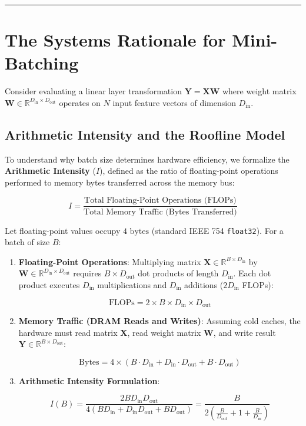 \documentclass[
  letterpaper,
]{scrbook}
\begin{document}
\begin{center}\rule{0.5\linewidth}{0.5pt}\end{center}

\section{The Systems Rationale for
Mini-Batching}\label{the-systems-rationale-for-mini-batching}

Consider evaluating a linear layer transformation
\(\mathbf{Y} = \mathbf{X} \mathbf{W}\) where weight matrix
\(\mathbf{W} \in \mathbb{R}^{D_{\text{in}} \times D_{\text{out}}}\)
operates on \(N\) input feature vectors of dimension \(D_{\text{in}}\).

\subsection{Arithmetic Intensity and the Roofline
Model}\label{arithmetic-intensity-and-the-roofline-model}

To understand why batch size determines hardware efficiency, we
formalize the \textbf{Arithmetic Intensity} (\(I\)), defined as the
ratio of floating-point operations performed to memory bytes transferred
across the memory bus:

\[I = \frac{\text{Total Floating-Point Operations (FLOPs)}}{\text{Total Memory Traffic (Bytes Transferred)}}\]

Let floating-point values occupy \(4\text{ bytes}\) (standard IEEE 754
\texttt{float32}). For a batch of size \(B\):

\begin{enumerate}
\def\labelenumi{\arabic{enumi}.}
\item
  \textbf{Floating-Point Operations}: Multiplying matrix
  \(\mathbf{X} \in \mathbb{R}^{B \times D_{\text{in}}}\) by
  \(\mathbf{W} \in \mathbb{R}^{D_{\text{in}} \times D_{\text{out}}}\)
  requires \(B \times D_{\text{out}}\) dot products of length
  \(D_{\text{in}}\). Each dot product executes \(D_{\text{in}}\)
  multiplications and \(D_{\text{in}}\) additions (\(2 D_{\text{in}}\)
  FLOPs):

  \[\text{FLOPs} = 2 \times B \times D_{\text{in}} \times D_{\text{out}}\]
\item
  \textbf{Memory Traffic (DRAM Reads and Writes)}: Assuming cold caches,
  the hardware must read matrix \(\mathbf{X}\), read weight matrix
  \(\mathbf{W}\), and write result
  \(\mathbf{Y} \in \mathbb{R}^{B \times D_{\text{out}}}\):

  \[\text{Bytes} = 4 \times \left( B \cdot D_{\text{in}} + D_{\text{in}} \cdot D_{\text{out}} + B \cdot D_{\text{out}} \right)\]
\item
  \textbf{Arithmetic Intensity Formulation}:

  \[I(B) = \frac{2 B D_{\text{in}} D_{\text{out}}}{4 \left( B D_{\text{in}} + D_{\text{in}} D_{\text{out}} + B D_{\text{out}} \right)} = \frac{B}{2 \left( \frac{B}{D_{\text{out}}} + 1 + \frac{B}{D_{\text{in}}} \right)}\]
\end{enumerate}
\end{document}
